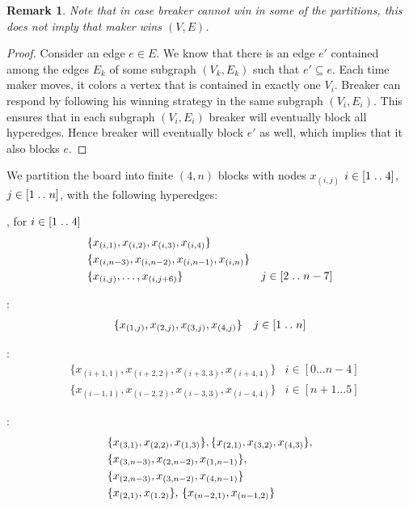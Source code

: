 \documentclass[conference]{IEEEtran}
\newcommand{\isep}{\mathrel{{.}\,{.}}\nobreak}
\newtheorem{remark}[theorem]{Remark}
\theoremstyle{definition}
\begin{document}
\begin{remark}
Note that in case breaker cannot win in some of the partitions, this does not imply that maker wins $(V,E)$.
\end{remark}

\begin{proof}
Consider an edge $e \in E$. We know that there is an edge $e'$ contained among the edges $E_k$ of some subgraph $(V_k, E_k)$ such that $e' \subseteq e$.  Each time maker moves, it colors a vertex that is contained in exactly one $V_i$. Breaker can respond by following his winning strategy in the same subgraph $(V_i, E_i)$. This ensures that in each subgraph $(V_i, E_i)$ breaker will eventually block all hyperedges. Hence breaker will eventually block $e'$ as well, which implies that it also blocks $e$. 
\end{proof}


We  partition the board into finite $(4,n)$ blocks with nodes $x_{(i,j)}$ $i\in [1\isep 4]$, $j \in [1\isep n]$, with the following hyperedges:
    
, for $i \in [1\isep 4]$
        \begin{align}
        &\{x_{(i,1)},x_{(i,2)},x_{(i,3)},x_{(i,4)}\} \label{horizontal-4} \\
        &\{x_{(i,n-3)},x_{(i,n-2)},x_{(i,n-1)},x_{(i,n)}\} \label{7-line-def}\\
        &\{x_{(i,j)},\dots,x_{(i,j+6)}\} & j \in [2 \isep n-7]
    \end{align}
    
:
        \begin{align}
        &\{x_{(1,j)},x_{(2,j)},x_{(3,j)},x_{(4,j)}\} & j \in [1 \isep n] \label{vertical-4} 
        \end{align}
    
:
        \begin{align}
        &\{x_{(i+1,1)},x_{(i+2,2)},x_{(i+3,3)},x_{(i+4,4)}\} & i \in [0 \dots n-4] \label{cross-4-1}\\
        &\{x_{(i-1,1)},x_{(i-2,2)},x_{(i-3,3)},x_{(i-4,4)}\} & i \in [n+1 \dots 5] \label{cross-4-2}
        \end{align}
        
:
        \begin{align}
        &\{x_{(3,1)},x_{(2,2)},x_{(1,3)}\}, \{x_{(2,1)},x_{(3,2)},x_{(4,3)}\}, \notag \\
        &\{x_{(3,n-3)},x_{(2,n-2)},x_{(1,n-1)}\}, \notag \\ 
        &\{x_{(2,n-3)},x_{(3,n-2)},x_{(4,n-1)}\} \label{three-rules}\\
        & \{x_{(2,1)},x_{(1.2)}\}, \, \{x_{(n-2,1)},x_{(n-1,2)}\} \label{two-rules}
        \end{align}
\end{document}
